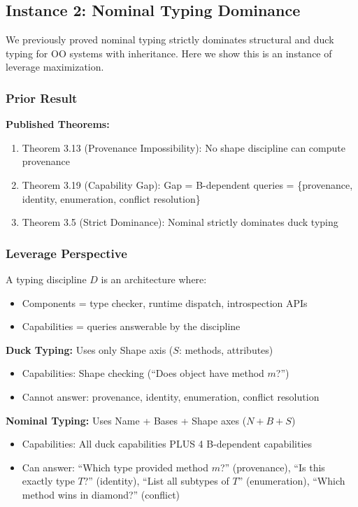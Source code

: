 \subsection{Instance 2: Nominal Typing Dominance}

We previously proved nominal typing strictly dominates structural and duck typing for OO systems with inheritance. Here we show this is an instance of leverage maximization.

\subsubsection{Prior Result}

\textbf{Published Theorems:}
\begin{enumerate}
\item Theorem 3.13 (Provenance Impossibility): No shape discipline can compute provenance
\item Theorem 3.19 (Capability Gap): Gap = B-dependent queries = \{provenance, identity, enumeration, conflict resolution\}
\item Theorem 3.5 (Strict Dominance): Nominal strictly dominates duck typing
\end{enumerate}

\subsubsection{Leverage Perspective}

\begin{definition}
A typing discipline $D$ is an architecture where:
\begin{itemize}
\item Components = type checker, runtime dispatch, introspection APIs
\item Capabilities = queries answerable by the discipline
\end{itemize}
\end{definition}

\textbf{Duck Typing:} Uses only Shape axis ($S$: methods, attributes)
\begin{itemize}
\item Capabilities: Shape checking (``Does object have method $m$?'')
\item Cannot answer: provenance, identity, enumeration, conflict resolution
\end{itemize}

\textbf{Nominal Typing:} Uses Name + Bases + Shape axes ($N + B + S$)
\begin{itemize}
\item Capabilities: All duck capabilities PLUS 4 B-dependent capabilities
\item Can answer: ``Which type provided method $m$?'' (provenance), ``Is this exactly type $T$?'' (identity), ``List all subtypes of $T$'' (enumeration), ``Which method wins in diamond?'' (conflict)
\end{itemize}


